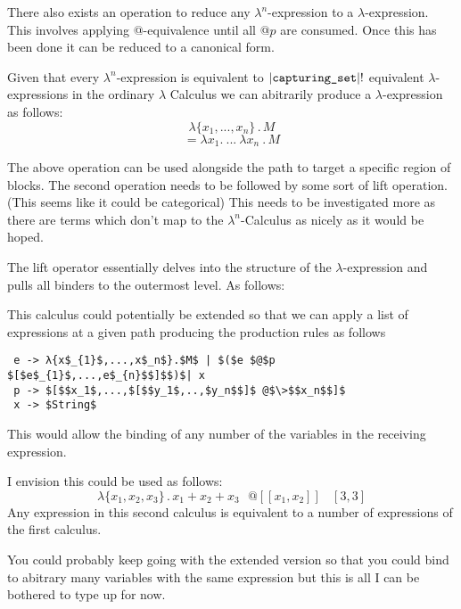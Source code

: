 \documentclass{article}
\begin{document}
\noindent There also exists an operation to reduce any $\lambda^n$-expression to a $\lambda$-expression. This involves applying @-equivalence until all @$p$ are consumed. Once this has been done it can be reduced to a canonical form.

\noindent Given that every $\lambda^{n}$-expression is equivalent to $|\verb|capturing_set||!$ equivalent $\lambda$-expressions in the ordinary $\lambda$ Calculus we can abitrarily produce a $\lambda$-expression as follows: 
\begin{equation}
    \lambda\{x_1,..., x_n\}\,.\,M
\end{equation}
\begin{equation}
   = \lambda x_1 .\>...\>\lambda x_n\>.\,M  
\end{equation}
\par
\noindent The above operation can be used alongside the path to target a specific region of blocks. The second operation needs to be followed by some sort of lift operation. (This seems like it could be categorical) This needs to be investigated more as there are terms which don't map to the $\lambda^n$-Calculus as nicely as it would be hoped.

\noindent The lift operator essentially delves into the structure of the $\lambda$-expression and pulls all binders to the outermost level. As follows:


\noindent This calculus could potentially be extended so that we can apply a list of expressions at a given path producing the production rules as follows
\begin{lstlisting}
 e -> λ{x$_{1}$,...,x$_n$}.$M$ | $($e $@$p $[$e$_{1}$,...,e$_{n}$$]$$)$| x
 p -> $[$$x_1$,...,$[$$y_1$,..,$y_n$$]$ @$\>$$x_n$$]$
 x -> $String$
\end{lstlisting}
\vspace{-5mm}
\noindent This would allow the binding of any number of the variables in the receiving expression. 

\noindent I envision this could be used as follows:
\begin{equation}
    \lambda\{x_1,x_2,x_3\}\,.\,x_1 + x_2 + x_3 \>\>\>@[[x_1, x_2]]\>\>\>\>[3,3]
\end{equation}
\noindent Any expression in this second calculus is equivalent to a number of expressions of the first calculus.

\noindent You could probably keep going with the extended version so that you could bind to abitrary many variables with the same expression but this is all I can be bothered to type up for now.
\end{document}
